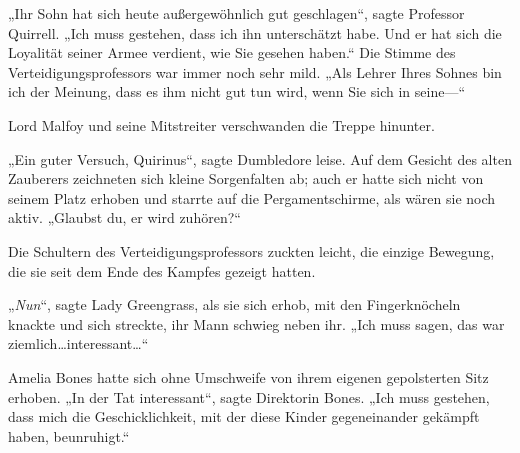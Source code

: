 „Ihr Sohn hat sich heute außergewöhnlich gut geschlagen“, sagte Professor Quirrell. „Ich muss gestehen, dass ich ihn unterschätzt habe. Und er hat sich die Loyalität seiner Armee verdient, wie Sie gesehen haben.“ Die Stimme des Verteidigungsprofessors war immer noch sehr mild. „Als Lehrer Ihres Sohnes bin ich der Meinung, dass es ihm nicht gut tun wird, wenn Sie sich in seine—“

Lord Malfoy und seine Mitstreiter verschwanden die Treppe hinunter.

„Ein guter Versuch, Quirinus“, sagte Dumbledore leise. Auf dem Gesicht des alten Zauberers zeichneten sich kleine Sorgenfalten ab; auch er hatte sich nicht von seinem Platz erhoben und starrte auf die Pergamentschirme, als wären sie noch aktiv. „Glaubst du, er wird zuhören?“

Die Schultern des Verteidigungsprofessors zuckten leicht, die einzige Bewegung, die sie seit dem Ende des Kampfes gezeigt hatten.

„\emph{Nun}“, sagte Lady Greengrass, als sie sich erhob, mit den Fingerknöcheln knackte und sich streckte, ihr Mann schwieg neben ihr. „Ich muss sagen, das war ziemlich…interessant…“

Amelia Bones hatte sich ohne Umschweife von ihrem eigenen gepolsterten Sitz erhoben. „In der Tat interessant“, sagte Direktorin Bones. „Ich muss gestehen, dass mich die Geschicklichkeit, mit der diese Kinder gegeneinander gekämpft haben, beunruhigt.“

